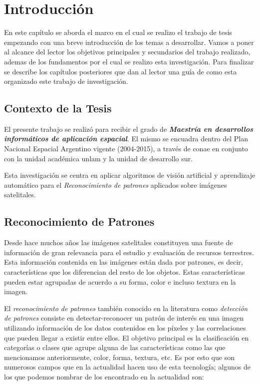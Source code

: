 \chapter{Introducción}\label{chap:introduccion}

En este capítulo se aborda el marco en el cual se realizo el trabajo de tesis empezando con una breve introducción de los temas a desarrollar. Vamos a poner al alcance del lector los objetivos principales y secundarios del trabajo realizado, ademas de los fundamentos por el cual se realizo esta investigación. Para finalizar se describe los capítulos posteriores que dan al lector una guía de como esta organizado este trabajo de investigación.


\section{Contexto de la Tesis}\label{sec:contexto}
El presente trabajo se realizó para recibir el grado de\textbf{ \textit{Maestría en desarrollos informáticos de aplicación espacial}}. El mismo se encuadra dentro del Plan Nacional Espacial Argentino vigente (2004-2015), a través de \ac{conae} en conjunto con la unidad académica \ac{unlam} y la unidad de desarrollo \ac{sur}.

Esta investigación se centra en aplicar  algoritmos de visión artificial y aprendizaje automático para el \textit{Reconocimiento de patrones} aplicados sobre imágenes satelitales.

\section{Reconocimiento de Patrones}\label{sec:introreconocimiento}
Desde hace muchos años las imágenes satelitales constituyen una fuente de información de gran relevancia para el estudio y evaluación de recursos terrestres. Esta  información contenida en las imágenes están dada por patrones, es decir, características que los diferencian del resto de los objetos. Estas características pueden estar agrupadas  de acuerdo a su forma, color e incluso textura en la imagen.

El \textit{reconocimiento de patrones} también conocido en la literatura como \textit{detección de patrones} consiste en detectar-reconocer un patrón de interés en una imagen utilizando información de los datos contenidos en los píxeles y las correlaciones que pueden llegar a existir entre ellos. El objetivo principal es la clasificación  en categorías o clases que agrupe alguna de las características como las que mencionamos anteriormente, color, forma, textura, etc. Es por esto que son numerosos campos que en la actualidad hacen uso de esta tecnología; algunos de los que podemos nombrar de los encontrado en la actualidad son:

